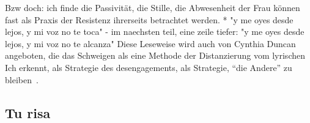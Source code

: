 Bzw doch: ich finde die Passivität, die Stille, die Abwesenheit der Frau können fast als Praxis der Resistenz ihrerseits betrachtet werden.
  * "y me oyes desde lejos, y mi voz no te toca" - im naechsten teil, eine zeile tiefer: "y me oyes desde lejos, y mi voz no te alcanza"
Diese Leseweise wird auch von Cynthia Duncan angeboten, die das Schweigen als eine Methode der Distanzierung vom lyrischen Ich erkennt, als Strategie des desengagements, als Strategie, ``die Andere'' zu bleiben~\cite{Duncan1992}.

\begin{comment}
  * 4 x 4Line verse: Quartette (lookup wie das korrekt heißt auf Deutsch!) + 2 x 2Zeiler (Couplets) --> erinnert ein bisschen an Sonnetform aber nicht ganz (Wie heißen nochma die verschiedene Sonnetformen? Nicht die von Gongora sondern die von Shakespeare meine ich grad: 3x4Zeilen und dann 2)
\end{comment}

\subsection{Tu risa}

